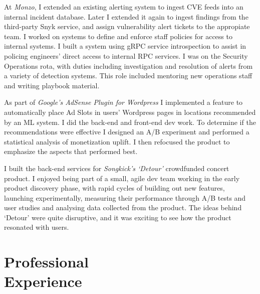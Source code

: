 \documentclass[line]{resume}
\begin{document}
\begin{resume}
    At \textsl{Monzo}, I extended an existing alerting system to ingest CVE feeds into an internal incident database.
    Later I extended it again to ingest findings from the third-party Snyk service, and assign vulnerability alert tickets
    to the appropiate team. I worked on systems to define and enforce staff policies for access to internal systems. I
    built a system using gRPC service introspection to assist in policing engineers' direct access to internal RPC
    services.  I was on the Security Operations rota, with duties including investigation and resolution of alerts
    from a variety of detection systems.  This role included mentoring new operations staff and writing playbook
    material.

    As part of \textsl{Google's AdSense Plugin for Wordpress} I implemented a feature to automatically place Ad Slots
    in users' Wordpress pages in locations recommended by an ML system. I did the back-end and front-end dev work.  To
    determine if the recommendations were effective I designed an A/B experiment and performed a statistical analysis
    of monetization uplift.  I then refocused the product to emphasize the aspects that performed best.

    I built the back-end services for \textsl{Songkick's `Detour'} crowdfunded concert product. I enjoyed
    being part of a small, agile dev team working in the early product discovery phase, with rapid cycles of building
    out new features, launching experimentally, measuring their performance through A/B tests and user studies and
    analysing data collected from the product. The ideas behind `Detour' were quite disruptive, and it was exciting to
    see how the product resonated with users.

    \pagebreak

    \section{\mysidestyle Professional\\Experience}


\end{resume}
\end{document}

